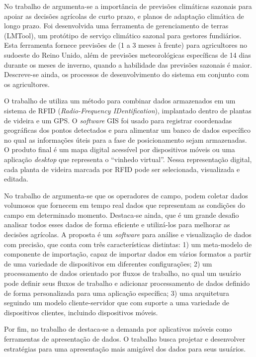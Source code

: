 \documentclass[12pt]{article}
\begin{document}
No trabalho de  argumenta-se a importância de previsões climáticas sazonais para apoiar as decisões agrícolas de curto prazo, e planos de adaptação climática de longo prazo. Foi desenvolvida uma ferramenta de gerenciamento de terras (LMTool), um protótipo de serviço climático sazonal para gestores fundiários. Esta ferramenta fornece previsões de (1 a 3 meses à frente) para agricultores no sudoeste do Reino Unido, além de previsões meteorológicas específicas de 14 dias durante os meses de inverno, quando a habilidade das previsões sazonais é maior. Descreve-se ainda, os processos de desenvolvimento do sistema em conjunto com os agricultores.

O trabalho de  utiliza um método para combinar dados armazenados em um sistema de RFID (\textit{Radio-Frequency IDentification}), implantado dentro de plantas de videira e um GPS. O \textit{software} GIS foi usado para registrar coordenadas geográficas dos pontos detectados e para alimentar um banco de dados específico no qual as informações úteis para a fase de posicionamento sejam armazenadas. O produto final é um mapa digital acessível por dispositivos móveis ou uma aplicação \textit{desktop} que representa o ``vinhedo virtual''. Nessa representação digital, cada planta de videira marcada por RFID pode ser selecionada, visualizada e editada.

No trabalho de  argumenta-se que os operadores de campo, podem coletar dados volumosos que fornecem em tempo real dados que representam as condições do campo em determinado momento. Destaca-se ainda, que é um grande desafio analisar todos esses dados de forma eficiente e utilizá-los para melhorar as decisões agrícolas. A proposta é um \textit{software} para análise e visualização de dados com precisão, que conta com três características distintas: 1) um meta-modelo de componente de importação, capaz de importar dados em vários formatos a partir de uma variedade de dispositivos em diferentes configurações; 2) um processamento de dados orientado por fluxos de trabalho, no qual um usuário pode definir seus fluxos de trabalho e adicionar processamento de dados definido de forma personalizada para uma aplicação específica; 3) uma arquitetura seguindo um modelo cliente-servidor que com suporte a uma variedade de dispositivos clientes, incluindo dispositivos móveis.

Por fim, no trabalho de  destaca-se a demanda por aplicativos móveis como ferramentas de apresentação de dados. O trabalho busca projetar e desenvolver estratégias para uma apresentação mais amigável dos dados para seus usuários.
\end{document}
